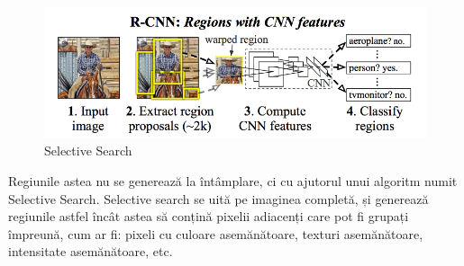 \begin{figure}[h!]
    	\centering
	\captionsetup{justification=centering, margin=2cm}
	\includegraphics[width=1.0\textwidth]{figures/selective_search.png}
	\caption{Selective Search \cite{selective_search}}
	\label{fig:selective_search}
\end{figure}
Regiunile astea nu se generează la întâmplare, ci cu ajutorul unui algoritm numit Selective Search. Selective search se uită pe imaginea completă, și generează regiunile astfel încât astea să conțină pixelii adiacenți care pot fi grupați împreună, cum ar fi: pixeli cu culoare asemănătoare, texturi asemănătoare, intensitate asemănătoare, etc.\newline

